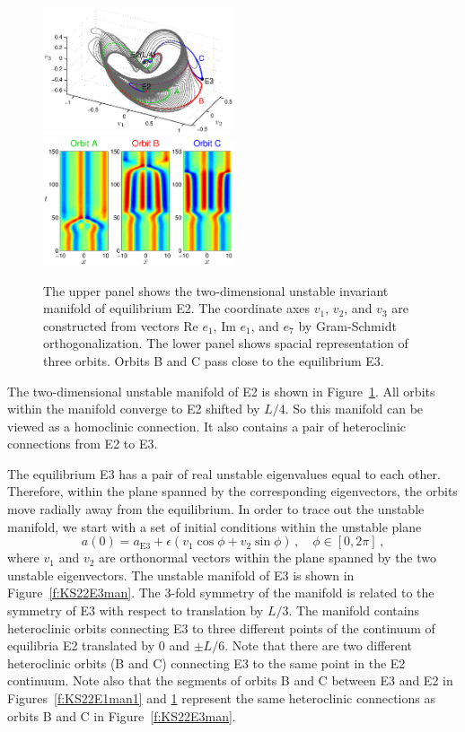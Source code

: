 \begin{figure}[h]\vspace*{-5pt} \centering
\includegraphics[width=0.5\textwidth]{figs/ks22_E2_manifold.eps}
\includegraphics[width=0.5\textwidth]{figs/ks22_E2_orbits.eps}
\vspace*{-5pt}\caption{ {\small The upper panel shows the two-dimensional
unstable invariant manifold of equilibrium E2. The coordinate axes
$v_1$, $v_2$, and $v_3$ are constructed from vectors
Re $e_1$, Im $e_1$, and $e_7$ by Gram-Schmidt orthogonalization.
The lower panel shows spacial representation of three orbits. Orbits
B and C pass close to the equilibrium E3.}}
\label{f:KS22E2man}\vspace*{-5pt}
\end{figure}

The two-dimensional unstable manifold of E2 is shown in
Figure~\ref{f:KS22E2man}.  All orbits within the manifold converge
to E2 shifted by $L/4$.  So this manifold can be viewed as a homoclinic
connection.  It also contains a pair of heteroclinic connections from
E2 to E3.

The equilibrium E3 has a pair of real unstable eigenvalues
equal to each other.  Therefore, within the plane spanned by the
corresponding eigenvectors, the orbits move radially away from
the equilibrium.  In order to trace out the unstable manifold,
we start with a set of initial conditions within the unstable plane
\[ a(0) = a_\mathrm{E3} + \epsilon(v_1 \cos \phi + v_2 \sin \phi)\,,
  \quad\phi\in[0,2\pi]\,, \]
where $v_1$ and $v_2$ are orthonormal vectors within the
plane spanned by the two unstable eigenvectors.  The unstable manifold
of E3 is shown in Figure~\ref{f:KS22E3man}.  The 3-fold symmetry of
the manifold is related to the symmetry of E3 with respect to
translation by $L/3$.  The manifold contains heteroclinic orbits
connecting E3 to three different points of the continuum of equilibria E2
translated by 0 and $\pm L/6$.  Note that there are two different
heteroclinic orbits (B and C) connecting E3 to the same point in the E2
continuum.  Note also that the segments of orbits B and C
between E3 and E2 in Figures~\ref{f:KS22E1man1} and \ref{f:KS22E2man}
represent the same heteroclinic connections as orbits B and C in
Figure~\ref{f:KS22E3man}.


